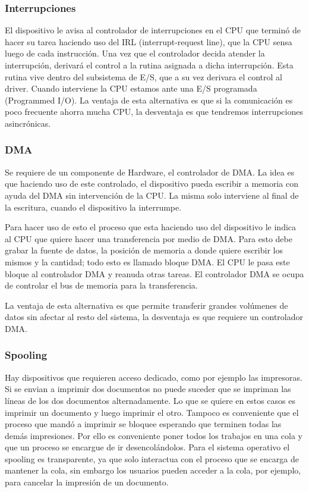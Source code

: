\documentclass{article}
\begin{document}
\subsubsection{Interrupciones}

El dispositivo le avisa al controlador de interrupciones en el CPU que termin\'o de hacer su tarea haciendo uso del IRL (interrupt-request line), que la CPU sensa luego de cada instrucción. Una vez que el controlador decida atender la interrupci\'on, derivará el control a la rutina asignada a dicha interrupción. Esta rutina vive dentro del subsistema de E/S, que a su vez derivara el control al driver. Cuando interviene la CPU estamos ante una E/S programada (Programmed I/O). La ventaja de esta alternativa es que si la comunicación es poco frecuente ahorra mucha CPU, la desventaja es que tendremos interrupciones asincrónicas.

\subsubsection{DMA}

Se requiere de un componente de Hardware, el controlador de DMA. La idea es que haciendo uso de este controlado, el dispositivo pueda escribir a memoria con ayuda del DMA sin intervención de la CPU. La misma solo interviene al final de la escritura, cuando el dispositivo la interrumpe.

Para hacer uso de esto el proceso que esta haciendo uso del dispositivo le indica al CPU que quiere hacer una transferencia por medio de DMA. Para esto debe grabar la fuente de datos, la posición de memoria a donde quiere escribir los mismos y la cantidad; todo esto es llamado bloque DMA. El CPU le pasa este bloque al controlador DMA y reanuda otras tareas. El controlador DMA se ocupa de controlar el bus de memoria para la transferencia.

La ventaja de esta alternativa es que permite transferir grandes volúmenes de datos sin afectar al resto del sistema, la desventaja es que requiere un controlador DMA.

\subsubsection{Spooling}

Hay dispositivos que requieren acceso dedicado, como por ejemplo las impresoras. Si se envian a imprimir dos documentos no puede suceder que se impriman las l\'ineas de los dos documentos alternadamente. Lo que se quiere en estos casos es imprimir un documento y luego imprimir el otro. Tampoco es conveniente que el proceso que mand\'o a imprimir se bloquee esperando que terminen todas las dem\'as impresiones. Por ello es conveniente poner todos los trabajos en una cola y que un proceso se encargue de ir desencol\'andolos. Para el sistema operativo el spooling es transparente, ya que solo interactua con el proceso que se encarga de mantener la cola, sin embargo los usuarios pueden acceder a la cola, por ejemplo, para cancelar la impresi\'on de un documento.
\end{document}
